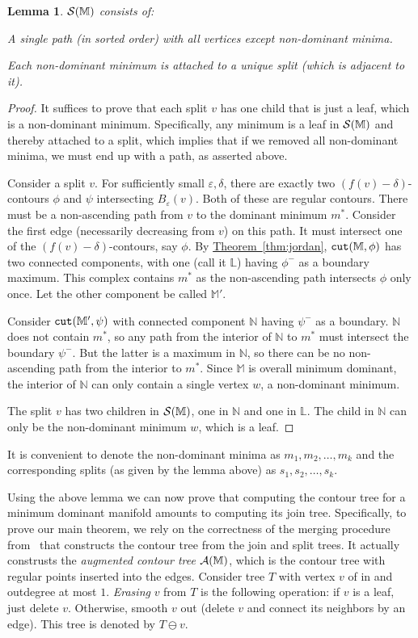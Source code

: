 \documentclass[11pt]{article}
\newtheorem{lemma}[theorem]{Lemma}
\theoremstyle{definition}
\newcommand{\cA}{{\cal A}}
\newcommand{\cS}{{\cal S}}
\newcommand{\LL}{\mathbb{L}}
\newcommand{\MM}{\mathbb{M}}
\newcommand{\NN}{\mathbb{N}}
\newcommand{\eps}{\varepsilon}
\newcommand{\Thm}[1]{\hyperref[thm:#1]{Theorem~\ref*{thm:#1}}} %
\newcommand{\cut}{{\tt cut}}
\begin{document}
\begin{lemma} \label{lem:split} $\cS(\MM)$ consists of:
\begin{asparaitem}
	\item A single path (in sorted order) with all vertices except non-dominant minima.
	\item Each non-dominant minimum is attached to a unique split (which is adjacent to it).
\end{asparaitem}
\end{lemma}

\begin{proof} It suffices to prove that each split $v$ has one child that is just a leaf, which
is a non-dominant minimum.  Specifically, any minimum is a leaf in $\cS(\MM)$ and thereby attached to a split, 
which implies that if we removed all non-dominant minima, we must end up with a path, as asserted above.

Consider a split $v$. For sufficiently small $\eps, \delta$, there are exactly two $(f(v) - \delta)$-contours
$\phi$ and $\psi$ intersecting $B_\eps(v)$. Both of these are regular contours. There must be a non-ascending
path from $v$ to the dominant minimum $m^*$. Consider the first edge (necessarily decreasing from $v$)
on this path. It must intersect one of the $(f(v) - \delta)$-contours, say $\phi$. By \Thm{jordan}, $\cut(\MM,\phi)$ has
two connected components, with one (call it $\LL$) having $\phi^-$ as a boundary maximum. This complex
contains $m^*$ as the non-ascending path intersects $\phi$ only once. Let the other
component be called $\MM'$.

Consider $\cut(\MM',\psi)$ with connected component $\NN$ having $\psi^-$ as a boundary. $\NN$
does not contain $m^*$, so any path from the interior of $\NN$ to $m^*$ must intersect the boundary $\psi^-$.
But the latter is a maximum in $\NN$, so there can be no non-ascending path from the interior to $m^*$.
Since $\MM$ is overall minimum dominant, the interior of $\NN$ can only contain a single vertex $w$, a non-dominant
minimum.

The split $v$ has two children in $\cS(\MM)$, one in $\NN$ and one in $\LL$. The child in $\NN$ can only
be the non-dominant minimum $w$, which is a leaf. 
\end{proof}

It is convenient to denote the non-dominant minima as $m_1, m_2, \ldots, m_k$
and the corresponding splits (as given by the lemma above) as $s_1, s_2, \ldots, s_k$. 

Using the above lemma we can now prove that computing the contour tree for a minimum dominant manifold 
amounts to computing its join tree.  Specifically, to prove our main theorem, we rely on the correctness of the
merging procedure from~\cite{csa-cctad-00} that constructs the contour tree from the join and split trees. 
It actually construsts the \emph{augmented contour tree} $\cA(\MM)$, which
is the contour tree with regular points inserted into the edges. 
Consider tree $T$ with vertex $v$ of in and outdegree at most $1$.
\emph{Erasing} $v$ from $T$ is the following operation: if $v$ is a leaf, just delete $v$. Otherwise, smooth $v$ out
(delete $v$ and connect its neighbors by an edge). This tree is denoted by $T \ominus v$.
\end{document}
